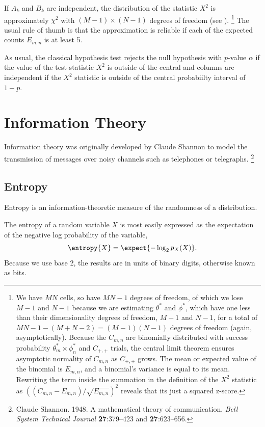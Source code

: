 If $A_k$ and $B_k$ are independent, the distribution of the statistic
$X^2$ is approximately $\chi^2$ with $(M-1) \times (N-1)$ degrees of
freedom (see ).%
%
\footnote{We have $MN$ cells, so have $MN-1$ degrees of freedom, of
  which we lose $M-1$ and $N-1$ because we are estimating $\theta^*$
  and $\phi^*$, which have one less than their dimensionality degrees
  of freedom, $M-1$ and $N-1$, for a total of $MN-1 - (M + N -2) =
  (M-1)(N-1)$ degrees of freedom (again, asymptotically).  Because the
  $C_{m,n}$ are binomially distributed with success probability
  $\theta^*_m \times \phi^*_n$ and $C_{+,+}$ trials, the central limit
  theorem ensures asymptotic normality of $C_{m,n}$ as $C_{+,+}$
  grows.  The mean or expected value of the binomial is $E_{m,n}$, and
  a binomial's variance is equal to its mean.  Rewriting the term
  inside the summation in the definition of the $X^2$ statistic as
  $((C_{m,n} - E_{m,n})/\sqrt{E_{m,n}})^2$ reveals that its just a
  squared z-score.}
%
The usual rule of thumb is that the approximation is reliable if each
of the expected counts $E_{m,n}$ is at least 5.

As usual, the classical hypothesis test rejects the null hypothesis with
$p$-value $\alpha$ if the value of the test statistic $X^2$ is outside
of the central and columns are independent if the $X^2$ statistic is
outside of the central probabiilty interval of $1-p$.


\section{Information Theory}

Information theory was originally developed by Claude Shannon to model
the transmission of messages over noisy channels such as telephones
or telegraphs.%
%
\footnote{Claude Shannon. 1948.  A mathematical theory of communication.  {\it Bell System Technical Journal} {\bf 27}:379--423 and {\bf 27}:623--656.}
%


\subsection{Entropy}\label{section:stats-entropy}

Entropy is an information-theoretic measure of the randomness of a
distribution.  


The entropy of a random variable $X$ is most easily expressed as the
expectation of the negative log probability of the variable,
%
\begin{equation}
\entropy{X} = \expect{- \log_2 p_X(X)}.
\end{equation}
%
Because we use base 2, the results are in units of binary digits,
otherwise known as bits.

